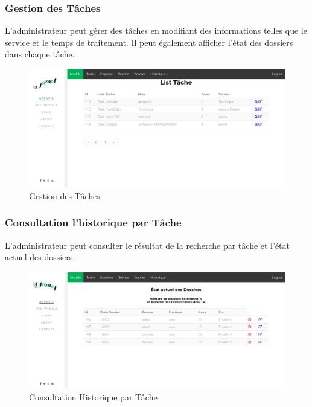  
 
 
 \subsubsection{Gestion des Tâches }
L'administrateur peut gérer des tâches en modifiant des informations telles que le service et le temps de traitement. Il peut également afficher l'état des dossiers dans chaque tâche. 
\begin{figure}[H]
	\centering
	\includegraphics[width=1\linewidth]{images/captures/capturesadmin/tache}
	\caption{Gestion des Tâches}
	\label{fig:tache}
\end{figure}

\subsubsection{ Consultation l'historique par Tâche }
L'administrateur peut consulter le résultat de la recherche par tâche et l'état actuel des dossiers. 
\begin{figure}[H]
	\centering
	\includegraphics[width=1\linewidth]{images/captures/capturesadmin/HTache}
	\caption{Consultation Historique par Tâche}
	\label{fig:htache}
\end{figure}


